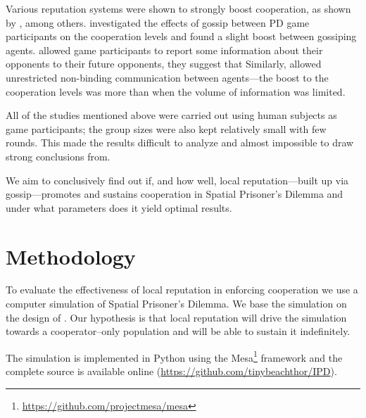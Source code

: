 \documentclass[english]{article}
\begin{document}
Various reputation systems were shown to strongly boost cooperation, as shown by \citet{simple-reputation, dong-reputation}, among others.
\citet{strangers-gossip} investigated the effects of gossip between PD game participants on the cooperation levels and found a slight boost between gossiping agents.
\citet{public-private-monitoring} allowed game participants to report some information about their opponents to their future opponents, they suggest that 
Similarly, \citet{cooperation-communication} allowed unrestricted non-binding communication between agents---the boost to the cooperation levels was more than when the volume of information was limited.

All of the studies mentioned above were carried out using human subjects as game participants; the group sizes were also kept relatively small with few rounds.
This made the results difficult to analyze and almost impossible to draw strong conclusions from.

We aim to conclusively find out if, and how well, local reputation---built up via gossip---promotes and sustains cooperation in Spatial Prisoner’s Dilemma and under what parameters does it yield optimal results.



\section{Methodology}
To evaluate the effectiveness of local reputation in enforcing cooperation we use a computer simulation of Spatial Prisoner’s Dilemma.
We base the simulation on the design of \citet{smaldino}.
Our hypothesis is that local reputation will drive the simulation towards a cooperator--only population and will be able to sustain it indefinitely.

The simulation is implemented in Python using the Mesa\footnote{\url{https://github.com/projectmesa/mesa}} framework and the complete source is available online (\url{https://github.com/tinybeachthor/IPD}).
\end{document}
